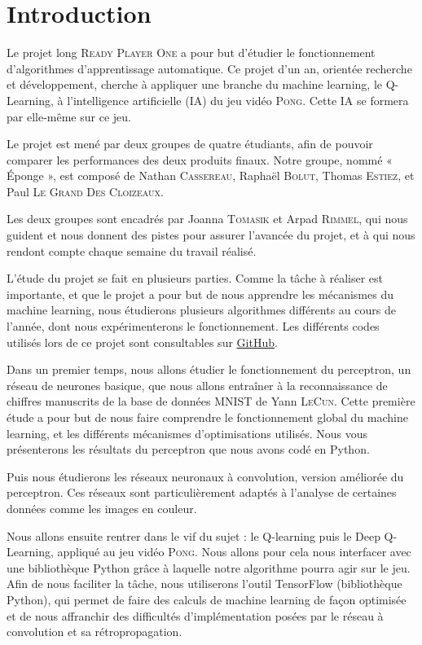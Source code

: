 \section*{Introduction}

Le projet long \textsc{Ready Player One} a pour but d’étudier le fonctionnement d’algorithmes d'apprentissage automatique. Ce projet d'un an, orientée recherche et développement, cherche à appliquer une branche du machine learning, le Q-Learning, à l’intelligence artificielle (IA)
du jeu vidéo \textsc{Pong}. Cette IA se formera par elle-même sur ce jeu.

Le projet est mené par deux groupes de quatre étudiants, afin de pouvoir comparer les performances des deux produits finaux. 
Notre groupe, nommé « Éponge », est composé de Nathan \textsc{Cassereau}, Raphaël \textsc{Bolut}, Thomas \textsc{Estiez}, et 
Paul \textsc{Le Grand Des Cloizeaux}. 

Les deux groupes sont encadrés par Joanna \textsc{Tomasik} et Arpad \textsc{Rimmel}, qui nous guident et nous donnent des pistes
pour assurer l'avancée du projet, et à qui nous rendont compte chaque semaine du travail réalisé.

L’étude du projet se fait en plusieurs parties. Comme la tâche à réaliser est importante, et que le projet a pour but 
de nous apprendre les mécanismes du machine learning, nous étudierons plusieurs algorithmes différents au cours de l’année, dont nous expérimenterons
le fonctionnement. 
Les différents codes utilisés lors de ce projet sont consultables sur \href{https://github.com/ready-player-one-supelec}{GitHub}.

Dans un premier temps, nous allons étudier le fonctionnement du perceptron, un réseau de neurones basique, que nous allons entraîner 
à la reconnaissance de chiffres manuscrits de la base de données MNIST de Yann \textsc{LeCun}. Cette première étude a pour but de nous faire 
comprendre le fonctionnement global du machine learning, et les différents mécanismes d’optimisations utilisés. Nous vous présenterons les résultats du perceptron que nous avons codé en Python.
 
Puis nous étudierons les réseaux neuronaux à convolution, version améliorée du perceptron. Ces réseaux sont particulièrement adaptés à l'analyse
de certaines données comme les images en couleur.

Nous allons ensuite rentrer dans le vif du sujet : le Q-learning puis le Deep Q-Learning, appliqué au jeu vidéo \textsc{Pong}. 
Nous allons pour cela nous interfacer avec une bibliothèque Python grâce à laquelle notre algorithme pourra agir sur le jeu. Afin de nous faciliter la tâche, nous 
utiliserons l’outil TensorFlow (bibliothèque Python), qui permet de faire des calculs de machine learning de façon optimisée et de nous affranchir
des difficultés d'implémentation posées par le réseau à convolution et sa rétropropagation.

